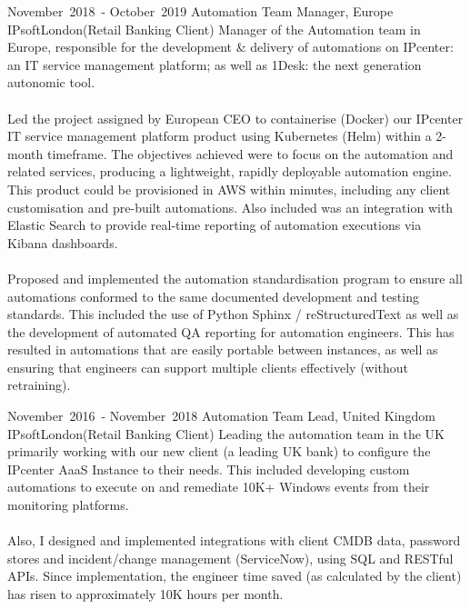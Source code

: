 \cventry %
  {\mbox{November 2018 -} \mbox{October 2019}}
  {Automation Team Manager, Europe}
  {IPsoft}{London}{(Retail Banking Client)}
  { 
    Manager of the Automation team in Europe, responsible for the 
    development \& delivery of automations on IPcenter: an IT service management 
    platform; as well as 1Desk: the next generation autonomic tool.\\~\\
    Led the project assigned by European CEO to containerise (Docker) our IPcenter 
    IT service management platform product using Kubernetes (Helm) within a 2-month timeframe. 
    The objectives achieved were to focus on the automation and related services, 
    producing a lightweight, rapidly deployable automation engine. 
    This product could be provisioned in AWS within minutes, including any client 
    customisation and pre-built automations. 
    Also included was an integration with Elastic Search to provide real-time 
    reporting of automation executions via Kibana dashboards.\\~\\
    Proposed and implemented the automation standardisation program to ensure all 
    automations conformed to the same documented development and testing standards. 
    This included the use of Python Sphinx / reStructuredText as well as the development 
    of automated QA reporting for automation engineers. 
    This has resulted in automations that are easily portable between instances, 
    as well as ensuring that engineers can support multiple clients effectively (without retraining).\\ 
  }

\cventry %
  {\mbox{November 2016 -} \mbox{November 2018}}
  {Automation Team Lead, United Kingdom}
  {IPsoft}{London}{(Retail Banking Client)}
  {
    Leading the automation team in the UK primarily working with our new client (a leading UK bank) to 
    configure the IPcenter AaaS Instance to their needs. This included developing custom 
    automations to execute on and remediate 10K+ Windows events from their monitoring platforms.\\~\\ 
    Also, I designed and implemented integrations with client CMDB data, password stores 
    and incident/change management (ServiceNow), using SQL and RESTful APIs. Since 
    implementation, the engineer time saved (as calculated by the client) has risen to approximately 
    10K hours per month.\\
  }

